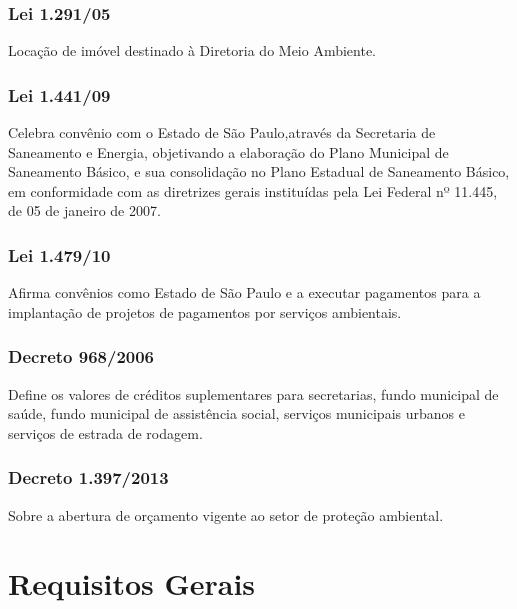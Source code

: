 \begin{subapend}
\begin{subsubapend}
 		\subsubsection{Lei 1.291/05}
 		Locação de imóvel destinado à Diretoria do Meio Ambiente.
 		\subsubsection{Lei 1.441/09}
 		Celebra convênio com o Estado de São Paulo,através da Secretaria de Saneamento e Energia, objetivando a elaboração do Plano Municipal de Saneamento Básico, e sua consolidação no Plano Estadual de Saneamento Básico, em conformidade com as diretrizes gerais instituídas pela Lei Federal nº 11.445, de 05 de janeiro de 2007.
 		\subsubsection{Lei 1.479/10}
 		Afirma convênios como Estado de São Paulo e a executar pagamentos para a implantação de projetos de pagamentos por serviços ambientais.
 		\subsubsection{Decreto 968/2006}
 		Define os valores de créditos suplementares para secretarias, fundo municipal de saúde, fundo municipal de assistência social, serviços municipais urbanos e serviços de estrada de rodagem.
 		\subsubsection{Decreto 1.397/2013}
 		Sobre a abertura de orçamento vigente ao setor de proteção ambiental.
 	\end{subsubapend}
 \end{subapend}

\section{Requisitos Gerais}

